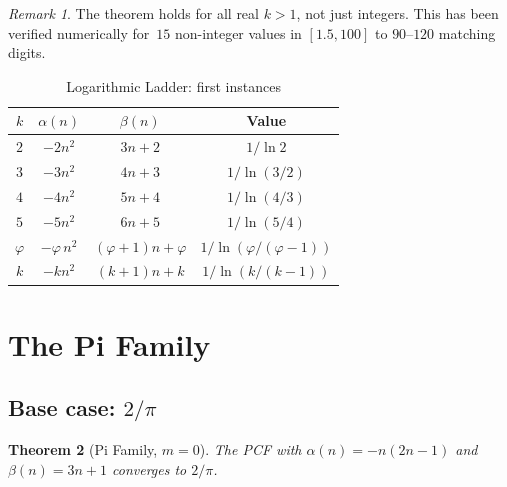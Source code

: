 \documentclass[11pt,a4paper]{article}
\theoremstyle{plain}
\newtheorem{theorem}{Theorem}[section]
\theoremstyle{definition}
\theoremstyle{remark}
\newtheorem{remark}[theorem]{Remark}
\begin{document}
\begin{remark}
The theorem holds for all real $k > 1$, not just integers.
This has been verified numerically for~$15$ non-integer values in
$[1.5, 100]$ to $90$--$120$ matching digits.
\end{remark}

\begin{table}[ht]
\centering
\caption{Logarithmic Ladder: first instances}\label{tab:log}
\begin{tabular}{@{}cccc@{}}
\toprule
$k$ & $\alpha(n)$ & $\beta(n)$ & Value \\
\midrule
$2$ & $-2n^2$ & $3n+2$ & $1/\ln 2$ \\
$3$ & $-3n^2$ & $4n+3$ & $1/\ln(3/2)$ \\
$4$ & $-4n^2$ & $5n+4$ & $1/\ln(4/3)$ \\
$5$ & $-5n^2$ & $6n+5$ & $1/\ln(5/4)$ \\
$\varphi$ & $-\varphi\, n^2$ & $(\varphi{+}1)n{+}\varphi$ &
  $1/\ln(\varphi/(\varphi{-}1))$ \\
$k$ & $-kn^2$ & $(k{+}1)n{+}k$ & $1/\ln(k/(k{-}1))$ \\
\bottomrule
\end{tabular}
\end{table}

\section{The Pi Family}\label{sec:pi}

\subsection{Base case: \texorpdfstring{$2/\pi$}{2/pi}}\label{sec:pi_base}

\begin{theorem}[Pi Family, $m=0$]\label{thm:pi0}
The PCF with $\alpha(n) = -n(2n{-}1)$ and $\beta(n) = 3n+1$
converges to $2/\pi$.
\end{theorem}
\end{document}
